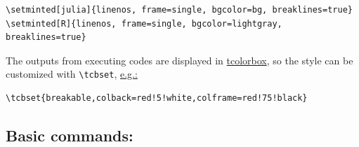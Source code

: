 \documentclass{ltxdoc}
\begin{document}
\begin{verbatim}
\setminted[julia]{linenos, frame=single, bgcolor=bg, breaklines=true}
\setminted[R]{linenos, frame=single, bgcolor=lightgray, breaklines=true}
\end{verbatim}

The outputs from executing codes are displayed in
\href{https://ctan.org/pkg/tcolorbox?lang=en}{tcolorbox}, so the style can
be customized with \texttt{\textbackslash{}tcbset},
\href{https://github.com/Ossifragus/runcode/blob/master/examples/MontyHall/MontyHall.tex\#L5}{e.g.:}

\begin{verbatim}
\tcbset{breakable,colback=red!5!white,colframe=red!75!black}
\end{verbatim}

\subsection{Basic commands:}
\label{sec:org1b11cd1}
\end{document}

